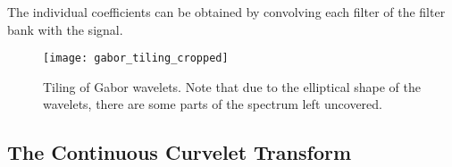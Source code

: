 The individual coefficients can be obtained by convolving each filter of the
filter bank with the signal.

\begin{figure}[h]
    \centering
        \texttt{[image: gabor\_tiling\_cropped]}
    \caption[Tiling of Gabor wavelets]{
        Tiling of Gabor wavelets. Note that due to the elliptical shape of the
        wavelets, there are some parts of the spectrum left uncovered.
        }
    \label{fig:gabor_tiling}
\end{figure}

\subsection{The Continuous Curvelet Transform}\label{sec:background_cct}

